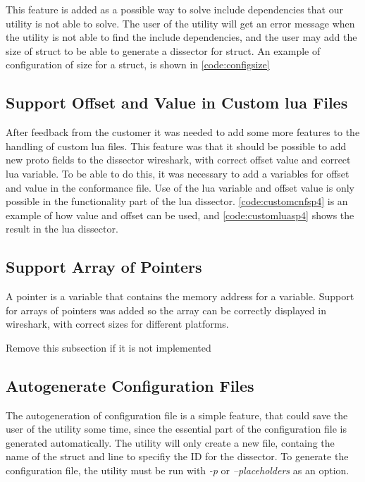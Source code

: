 This feature is added as a possible way to solve include dependencies that our 
\gls{utility} is not able to solve. The user of the \gls{utility} will get an error 
message when the \gls{utility} is not able to find the include dependencies, and the 
user may add the size of \gls{struct} to be able to generate a \gls{dissector} for \gls{struct}. 
An example of configuration of size for a \gls{struct}, is shown in 
\autoref{code:configsize}



\subsection{Support Offset and Value in Custom \Gls{lua} Files}
After feedback from the customer it was needed to add some more features to 
the handling of custom \Gls{lua} files. This feature was that it should be possible 
to add new proto fields to the \gls{dissector} \Gls{wireshark}, with correct offset value 
and correct \Gls{lua} variable. To be able to do this, it was necessary to add a 
variables for offset and value in the conformance file. Use of the \Gls{lua} 
variable and offset value is only possible in the functionality part of the 
\Gls{lua} \gls{dissector}. \autoref{code:customcnfsp4} is an example of how value and 
offset can be used, and \autoref{code:customluasp4} shows the result in the \Gls{lua} 
\gls{dissector}.





\subsection{Support Array of Pointers}
A pointer is a variable that contains the memory address for a variable. 
Support for arrays of pointers was added so the array can be correctly 
displayed in \Gls{wireshark}, with correct sizes for different platforms.

Remove this subsection if it is not implemented

\subsection{Autogenerate Configuration Files}
The autogeneration of configuration file is a simple feature, that could save 
the user of the \gls{utility} some time, since the essential part of the 
configuration file is generated automatically. The \gls{utility} will only create a new 
file, containg the name of the \gls{struct} and line to specifiy the ID for the 
\gls{dissector}. To generate the configuration file, the \gls{utility} must be run with 
\emph{-p} or \emph{--placeholders} as an option. 

